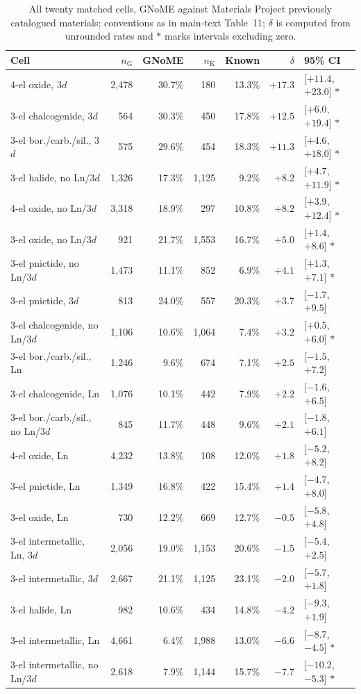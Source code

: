 \documentclass[11pt]{article}
\begin{document}
\begin{table}[htbp]\centering
\caption{All twenty matched cells, GNoME against Materials Project previously catalogued materials; conventions as in main-text Table~11; $\delta$ is computed from unrounded rates and $\ast$ marks intervals excluding zero.}\label{tab:appallcells}
\small\begin{tabular}{lrrrrrl}
\toprule
Cell & $n_{\text{G}}$ & GNoME & $n_{\text{K}}$ & Known & $\delta$ & 95\% CI \\
\midrule
4-el oxide, 3$d$ & 2{,}478 & 30.7\% & 180 & 13.3\% & $+17.3$ & [$+11.4$, $+23.0$] $\ast$ \\
3-el chalcogenide, 3$d$ & 564 & 30.3\% & 450 & 17.8\% & $+12.5$ & [$+6.0$, $+19.4$] $\ast$ \\
3-el bor./carb./sil., 3$d$ & 575 & 29.6\% & 454 & 18.3\% & $+11.3$ & [$+4.6$, $+18.0$] $\ast$ \\
3-el halide, no Ln/3$d$ & 1{,}326 & 17.3\% & 1{,}125 & 9.2\% & $+8.2$ & [$+4.7$, $+11.9$] $\ast$ \\
4-el oxide, no Ln/3$d$ & 3{,}318 & 18.9\% & 297 & 10.8\% & $+8.2$ & [$+3.9$, $+12.4$] $\ast$ \\
3-el oxide, no Ln/3$d$ & 921 & 21.7\% & 1{,}553 & 16.7\% & $+5.0$ & [$+1.4$, $+8.6$] $\ast$ \\
3-el pnictide, no Ln/3$d$ & 1{,}473 & 11.1\% & 852 & 6.9\% & $+4.1$ & [$+1.3$, $+7.1$] $\ast$ \\
3-el pnictide, 3$d$ & 813 & 24.0\% & 557 & 20.3\% & $+3.7$ & [$-1.7$, $+9.5$] \\
3-el chalcogenide, no Ln/3$d$ & 1{,}106 & 10.6\% & 1{,}064 & 7.4\% & $+3.2$ & [$+0.5$, $+6.0$] $\ast$ \\
3-el bor./carb./sil., Ln & 1{,}246 & 9.6\% & 674 & 7.1\% & $+2.5$ & [$-1.5$, $+7.2$] \\
3-el chalcogenide, Ln & 1{,}076 & 10.1\% & 442 & 7.9\% & $+2.2$ & [$-1.6$, $+6.5$] \\
3-el bor./carb./sil., no Ln/3$d$ & 845 & 11.7\% & 448 & 9.6\% & $+2.1$ & [$-1.8$, $+6.1$] \\
4-el oxide, Ln & 4{,}232 & 13.8\% & 108 & 12.0\% & $+1.8$ & [$-5.2$, $+8.2$] \\
3-el pnictide, Ln & 1{,}349 & 16.8\% & 422 & 15.4\% & $+1.4$ & [$-4.7$, $+8.0$] \\
3-el oxide, Ln & 730 & 12.2\% & 669 & 12.7\% & $-0.5$ & [$-5.8$, $+4.8$] \\
3-el intermetallic, Ln, 3$d$ & 2{,}056 & 19.0\% & 1{,}153 & 20.6\% & $-1.5$ & [$-5.4$, $+2.5$] \\
3-el intermetallic, 3$d$ & 2{,}667 & 21.1\% & 1{,}125 & 23.1\% & $-2.0$ & [$-5.7$, $+1.8$] \\
3-el halide, Ln & 982 & 10.6\% & 434 & 14.8\% & $-4.2$ & [$-9.3$, $+1.9$] \\
3-el intermetallic, Ln & 4{,}661 & 6.4\% & 1{,}988 & 13.0\% & $-6.6$ & [$-8.7$, $-4.5$] $\ast$ \\
3-el intermetallic, no Ln/3$d$ & 2{,}618 & 7.9\% & 1{,}144 & 15.7\% & $-7.7$ & [$-10.2$, $-5.3$] $\ast$ \\
\bottomrule
\end{tabular}
\end{table}
\end{document}
